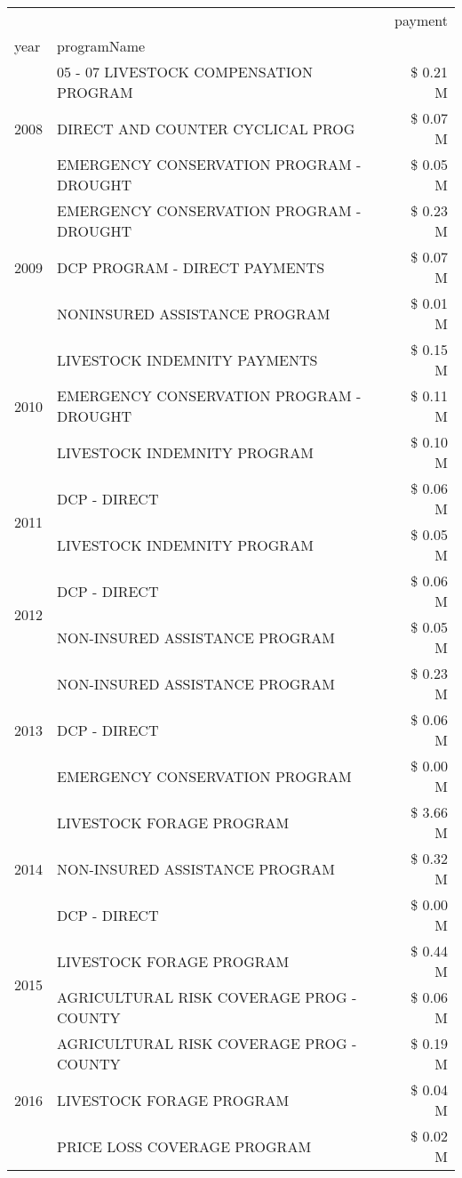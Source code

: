 \begin{tabular}{llr}
\toprule
 &  & payment \\
year & programName &  \\
\midrule
\multirow[t]{3}{*}{2008} & 05 - 07 LIVESTOCK COMPENSATION PROGRAM & \$ 0.21 M \\
 & DIRECT AND COUNTER CYCLICAL PROG & \$ 0.07 M \\
 & EMERGENCY CONSERVATION PROGRAM - DROUGHT & \$ 0.05 M \\
\cline{1-3}
\multirow[t]{3}{*}{2009} & EMERGENCY CONSERVATION PROGRAM - DROUGHT & \$ 0.23 M \\
 & DCP PROGRAM - DIRECT PAYMENTS & \$ 0.07 M \\
 & NONINSURED ASSISTANCE PROGRAM & \$ 0.01 M \\
\cline{1-3}
\multirow[t]{3}{*}{2010} & LIVESTOCK INDEMNITY PAYMENTS & \$ 0.15 M \\
 & EMERGENCY CONSERVATION PROGRAM - DROUGHT & \$ 0.11 M \\
 & LIVESTOCK INDEMNITY PROGRAM & \$ 0.10 M \\
\cline{1-3}
\multirow[t]{2}{*}{2011} & DCP - DIRECT & \$ 0.06 M \\
 & LIVESTOCK INDEMNITY PROGRAM & \$ 0.05 M \\
\cline{1-3}
\multirow[t]{2}{*}{2012} & DCP - DIRECT & \$ 0.06 M \\
 & NON-INSURED ASSISTANCE PROGRAM & \$ 0.05 M \\
\cline{1-3}
\multirow[t]{3}{*}{2013} & NON-INSURED ASSISTANCE PROGRAM & \$ 0.23 M \\
 & DCP - DIRECT & \$ 0.06 M \\
 & EMERGENCY CONSERVATION PROGRAM & \$ 0.00 M \\
\cline{1-3}
\multirow[t]{3}{*}{2014} & LIVESTOCK FORAGE PROGRAM & \$ 3.66 M \\
 & NON-INSURED ASSISTANCE PROGRAM & \$ 0.32 M \\
 & DCP - DIRECT & \$ 0.00 M \\
\cline{1-3}
\multirow[t]{2}{*}{2015} & LIVESTOCK FORAGE PROGRAM & \$ 0.44 M \\
 & AGRICULTURAL RISK COVERAGE PROG - COUNTY & \$ 0.06 M \\
\cline{1-3}
\multirow[t]{3}{*}{2016} & AGRICULTURAL RISK COVERAGE PROG - COUNTY & \$ 0.19 M \\
 & LIVESTOCK FORAGE PROGRAM & \$ 0.04 M \\
 & PRICE LOSS COVERAGE PROGRAM & \$ 0.02 M \\

\end{tabular}
